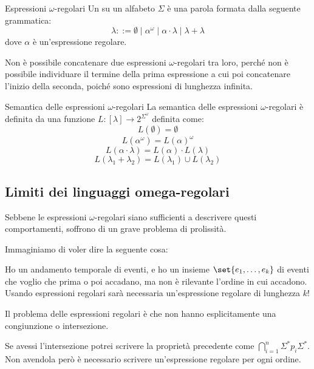 \begin{definition}{Espressioni \(\omega\)-regolari}
  Un  su un alfabeto \(\Sigma\) è una parola formata dalla seguente grammatica:
  \[\lambda ::= \emptyset \mid \alpha^\omega \mid \alpha \cdot \lambda \mid \lambda + \lambda\]
  dove \(\alpha\) è un'espressione regolare.
\end{definition}

\begin{note}{}
  Non è possibile concatenare due espressioni \(\omega\)-regolari tra loro, perché non è possibile individuare il termine della prima espressione a cui poi concatenare l'inizio della seconda, poiché sono espressioni di lunghezza infinita.
\end{note}

\begin{definition}{Semantica delle espressioni \(\omega\)-regolari}
  La semantica delle espressioni \(\omega\)-regolari è definita da una funzione \(L : [\lambda] \to 2^{\Sigma^\omega}\) definita come:
  \[L(\emptyset) = \emptyset\]
  \[L(\alpha^\omega) = {L(\alpha)}^\omega\]
  \[L(\alpha \cdot \lambda) = L(\alpha) \cdot L(\lambda)\]
  \[L(\lambda_1 + \lambda_2) = L(\lambda_1) \cup L(\lambda_2)\]
\end{definition}

\subsection{Limiti dei linguaggi omega-regolari}

Sebbene le espressioni \(\omega\)-regolari siano sufficienti a descrivere questi comportamenti, soffrono di un grave problema di prolissità.

\begin{example}{}
  Immaginiamo di voler dire la seguente cosa:

  Ho un andamento temporale di eventi, e ho un insieme \(\set{e_1,\ldots,e_k}\) di eventi che voglio che prima o poi accadano, ma non è rilevante l'ordine in cui accadono.
  Usando espressioni regolari sarà necessaria un'espressione regolare di lunghezza \(k\)!
\end{example}


Il problema delle espressioni regolari è che non hanno esplicitamente una congiunzione o intersezione.

Se avessi l'intersezione potrei scrivere la proprietà precedente come \(\bigcap_{i=1}^n \Sigma^* p_i \Sigma^*\). Non avendola però è necessario scrivere un'espressione regolare per ogni ordine.

